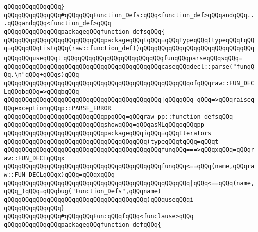 \verb|qQQqqQQqqQQqqQQq}|\newline
\newline
\verb|qQQqqQQqqQQqqQQq#qQQqqQQqFunction_Defs:qQQq<function_def>qQQqandqQQq...qQQqandqQQq<function_def>qQQq|\newline
\verb|qQQqqQQqqQQqqQQqpackageqQQqfunction_defsqQQq{|\newline
\newline
\verb|qQQqqQQqqQQqqQQqqQQqqQQqqQQqpackageqQQqtqQQq=qQQqTypeqQQq(typeqQQqtqQQq=qQQqqQQqListqQQq(raw::function_def))qQQqqQQqqQQqqQQqqQQqqQQqqQQqqQQqqQQqqQQquseqQQqt|\newline
\verb|qQQqqQQqqQQqqQQqqQQqqQQqqQQqfunqQQqparseqQQqsqQQq=|\newline
\verb|qQQqqQQqqQQqqQQqqQQqqQQqqQQqqQQqqQQqqQQqqQQqcaseqQQqdecl::parse("funqQQq.\n"qQQq+qQQqs)qQQq|\newline
\verb|qQQqqQQqqQQqqQQqqQQqqQQqqQQqqQQqqQQqqQQqqQQqqQQqqQQqofqQQqraw::FUN_DECLqQQqbqQQq=>qQQqbqQQq|\newline
\verb|qQQqqQQqqQQqqQQqqQQqqQQqqQQqqQQqqQQqqQQqqQQq|\verb#|qQQqqQQq_qQQq=>qQQqraiseqQQqexceptionqQQqp::PARSE_ERROR#\newline
\verb|qQQqqQQqqQQqqQQqqQQqqQQqqQQqppqQQq=qQQqraw_pp::function_defsqQQq|\newline
\verb|qQQqqQQqqQQqqQQqqQQqqQQqqQQqshowqQQq=qQQqasMLqQQqoqQQqpp|\newline
\verb|qQQqqQQqqQQqqQQqqQQqqQQqqQQqpackageqQQqiqQQq=qQQqIterators|\newline
\verb|qQQqqQQqqQQqqQQqqQQqqQQqqQQqqQQqqQQqqQQq(typeqQQqtqQQq=qQQqt|\newline
\verb|qQQqqQQqqQQqqQQqqQQqqQQqqQQqqQQqqQQqqQQqqQQqfunqQQq===>qQQqxqQQq=qQQqraw::FUN_DECLqQQqx|\newline
\verb|qQQqqQQqqQQqqQQqqQQqqQQqqQQqqQQqqQQqqQQqqQQqfunqQQq<==qQQq(name,qQQqraw::FUN_DECLqQQqx)qQQq=qQQqxqQQq|\newline
\verb|qQQqqQQqqQQqqQQqqQQqqQQqqQQqqQQqqQQqqQQqqQQqqQQqqQQq|\verb#|qQQq<==qQQq(name,qQQq_)qQQq=qQQqbug("Function_Defs",qQQqname)#\newline
\verb|qQQqqQQqqQQqqQQqqQQqqQQqqQQqqQQqqQQqqQQq)qQQquseqQQqi|\newline
\verb|qQQqqQQqqQQqqQQq}|\newline
\newline
\verb|qQQqqQQqqQQqqQQq#qQQqqQQqFun:qQQqfqQQq<funclause>qQQq|\newline
\verb|qQQqqQQqqQQqqQQqpackageqQQqfunction_defqQQq{|\newline
\newline
